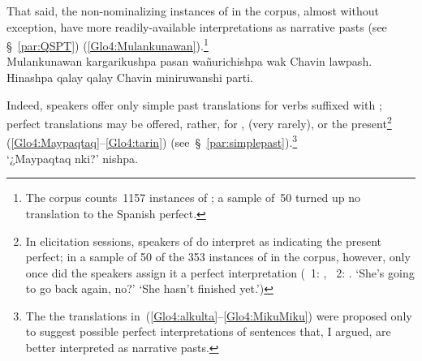 \noindent
That said, the non-nominalizing instances of  in the corpus, almost without exception, have more readily-available interpretations as narrative pasts (see §~\ref{par:QSPT}) (\ref{Glo4:Mulankunawan}).\footnote{The corpus counts~1157 instances of ; a sample of~50 turned up no translation to the Spanish perfect.}\\

%
{Mulankunawan kargarikushpa pasan wañurichishpa wak Chavin lawpash. Hinashpa qalay qalay Chavin miniruwanshi parti.}%
{}%
{}{}%

\noindent
Indeed, speakers offer only simple past translations for verbs suffixed with ; perfect translations may be offered, rather, for ,  (very rarely), or the present\footnote{In elicitation sessions, speakers of \SYQ{} do interpret  as indicating the present perfect; in a sample of 50 of the 353 instances of  in the corpus, however, only once did the speakers assign it a perfect interpretation (\spkr~1:  ,  \spkr~2:  . ‘She’s going to go back again, no?’ ‘She hasn’t finished yet.’)} (\ref{Glo4:Maypaqtaq}--\ref{Glo4:tarin}) (see~§~\ref{par:simplepast}).\footnote{The the translations in~(\ref{Glo4:alkulta}--\ref{Glo4:MikuMiku}) were proposed only to suggest possible perfect interpretations of sentences that, I argued, are better interpreted as narrative pasts.}\\

%
{‘¿Maypaqtaq nki?’ nishpa.}%
{}%
{}{}%

